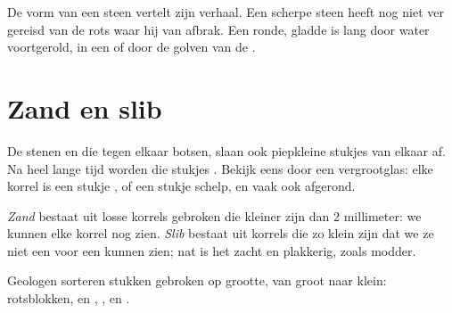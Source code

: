 \begin{remark}\label{rem:g3:stones-pebbles-sand:shape}
De vorm van een steen vertelt zijn verhaal. Een scherpe steen heeft nog
niet ver gereisd van de rots waar hij van afbrak. Een ronde, gladde 
is lang door water voortgerold, in een  of door de golven van de .
\end{remark}

\section{Zand en slib}

De stenen en  die tegen elkaar botsen, slaan ook piepkleine
stukjes van elkaar af. Na heel lange tijd worden die stukjes . Bekijk
 eens door een vergrootglas: elke korrel is een stukje , of
een stukje schelp, en vaak ook afgerond.

\begin{definition}\label{def:g3:stones-pebbles-sand:sand}
\emph{Zand} bestaat uit losse korrels gebroken  die
kleiner zijn dan 2 millimeter: we kunnen elke korrel nog zien.
\emph{Slib} bestaat uit korrels die zo klein zijn dat we ze
niet een voor een kunnen zien; nat is het zacht en plakkerig, zoals modder.
\end{definition}

Geologen sorteren stukken gebroken  op grootte, van groot naar
klein: rotsblokken,  en , , en .

